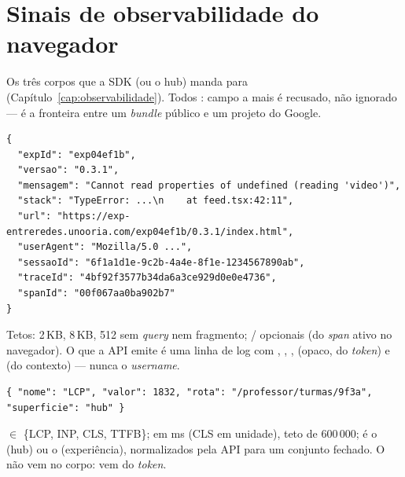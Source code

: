 \section{Sinais de observabilidade do navegador}

Os três corpos que a SDK (ou o hub) manda para 
(Capítulo~\ref{cap:observabilidade}). Todos : campo a mais é
recusado, não ignorado --- é a fronteira entre um \emph{bundle} público e um
projeto do Google.

\begin{lstlisting}[language=jsonunoo, caption={\rota{POST /observabilidade/erros-cliente}}]
{
  "expId": "exp04ef1b",
  "versao": "0.3.1",
  "mensagem": "Cannot read properties of undefined (reading 'video')",
  "stack": "TypeError: ...\n    at feed.tsx:42:11",
  "url": "https://exp-entreredes.unooria.com/exp04ef1b/0.3.1/index.html",
  "userAgent": "Mozilla/5.0 ...",
  "sessaoId": "6f1a1d1e-9c2b-4a4e-8f1e-1234567890ab",
  "traceId": "4bf92f3577b34da6a3ce929d0e0e4736",
  "spanId": "00f067aa0ba902b7"
}
\end{lstlisting}

Tetos:  2\,KB,  8\,KB,  512 sem \emph{query}
nem fragmento; / opcionais (do \emph{span} ativo no
navegador). O que a API emite é uma linha de log com
, ,
,  (opaco, do \emph{token}) e
 (do contexto) --- nunca o \emph{username}.

\begin{lstlisting}[language=jsonunoo, caption={\rota{POST /observabilidade/vitals}}]
{ "nome": "LCP", "valor": 1832, "rota": "/professor/turmas/9f3a", "superficie": "hub" }
\end{lstlisting}

 \(\in\) \{LCP, INP, CLS, TTFB\};  em ms (CLS em unidade),
teto de 600\,000;  é o  (hub) ou o 
(experiência), normalizados pela API para um conjunto fechado. O 
não vem no corpo: vem do \emph{token}.

